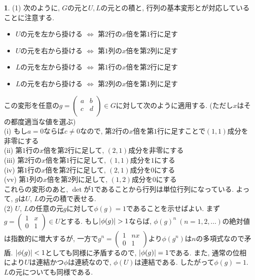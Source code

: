 \documentclass{article}
\theoremstyle{definition}
\newtheorem{ans}{}
\numberwithin{ans}{subsection}
\DeclarePairedDelimiter{\abs}{\lvert}{\rvert}
\begin{document}
\begin{ans}
  (1) 次のように, $G$の元と$U, L$の元との積と, 行列の基本変形とが対応していることに注意する.
  \begin{itemize}
    \item $U$の元を左から掛ける $\Leftrightarrow$ 第$2$行の$x$倍を第$1$行に足す
    \item $U$の元を右から掛ける $\Leftrightarrow$ 第$1$列の$x$倍を第$2$列に足す
    \item $L$の元を左から掛ける $\Leftrightarrow$ 第$1$行の$x$倍を第$2$行に足す
    \item $L$の元を右から掛ける $\Leftrightarrow$ 第$2$列の$x$倍を第$1$列に足す
  \end{itemize}
  この変形を任意の$g = \begin{pmatrix}
    a & b \\
    c & d \\
  \end{pmatrix} \in G$に対して次のように適用する. (ただし$x$はその都度適当な値を選ぶ) \\
  (i) もし$a = 0$ならば$c \neq 0$なので, 第$2$行の$x$倍を第$1行$に足すことで$(1, 1)$成分を非零にする \\
  (ii) 第$1$行の$x$倍を第$2$行に足して, $(2, 1)$成分を非零にする \\
  (iii) 第$2$行の$x$倍を第$1$行に足して, $(1, 1)$成分を$1$にする \\
  (iv) 第$1$行の$x$倍を第$2$行に足して, $(2, 1)$成分を$0$にする \\
  (vv) 第$1$列の$x$倍を第$2$列に足して, $(1, 2)$成分を$0$にする \\
  これらの変形のあと, $\det$が$1$であることから行列は単位行列になっている.
  よって, $g$は$U$, $L$の元の積で表せる.\\
  (2) $U$, $L$の任意の元$g$に対して$\phi(g) = 1$であることを示せばよい.
  まず$g = \begin{pmatrix}
    1 & x \\
    0 & 1
  \end{pmatrix} \in U$とする.
  もし$\abs{\phi(g)} > 1$ならば, $\phi(g)^n\ (n = 1, 2,...)$の絶対値は指数的に増大するが,
  一方で$g^n = \begin{pmatrix}
    1 & nx \\
    0 & 1
  \end{pmatrix}$より$\phi(g^n)$は$n$の多項式なので矛盾.
  $\abs{\phi(g)} < 1$としても同様に矛盾するので, $\abs{\phi(g)} = 1$である.
  また, 通常の位相により$U$は連結かつ$\phi$は連続なので, $\phi(U)$は連結である.
  したがって$\phi(g) = 1$.
  $L$の元についても同様である.
\end{ans}
\end{document}
